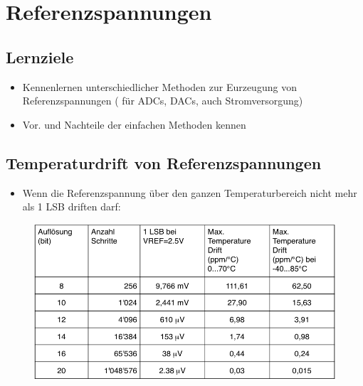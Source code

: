 \section{Referenzspannungen}
\subsection{Lernziele}
\begin{itemize}
  \item Kennenlernen unterschiedlicher Methoden zur Eurzeugung von
  Referenzspannungen ( für ADCs, DACs, auch Stromversorgung)
  \item Vor. und Nachteile der einfachen Methoden kennen
\end{itemize}

\subsection{Temperaturdrift von Referenzspannungen}
\begin{itemize}
  \item Wenn die Referenzspannung über den ganzen Temperaturbereich nicht mehr
  als 1 LSB driften darf:
\end{itemize}
\begin{figure}[!htbp]
\includegraphics[scale=0.5]{pictures/temperaturdrift}
\end{figure}
